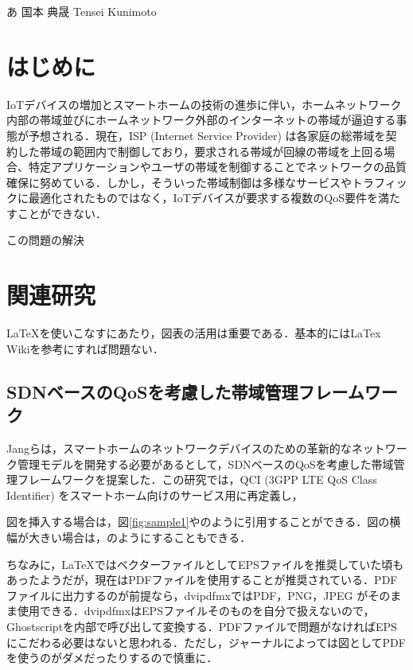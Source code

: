 \documentclass[a4paper,10pt,twocolumn,uplatex]{jsarticle}
\date{13}
\begin{document}
{あ}
{国本 典晟}
{Tensei Kunimoto}

\section{はじめに}
IoTデバイスの増加とスマートホームの技術の進歩に伴い，ホームネットワーク内部の帯域並びにホームネットワーク外部のインターネットの帯域が逼迫する事態が予想される．現在，ISP (Internet Service Provider) は各家庭の総帯域を契約した帯域の範囲内で制御しており，要求される帯域が回線の帯域を上回る場合、特定アプリケーションやユーザの帯域を制御することでネットワークの品質確保に努めている\cite{guideline}．しかし，そういった帯域制御は多様なサービスやトラフィックに最適化されたものではなく，IoTデバイスが要求する複数のQoS要件を満たすことができない．\par
この問題の解決

\section{関連研究}
\LaTeX{}を使いこなすにあたり，図表の活用は重要である．基本的にはLaTex Wiki\cite{latex_wiki}を参考にすれば問題ない．\par

\subsection{SDNベースのQoSを考慮した帯域管理フレームワーク}
Jangらは，スマートホームのネットワークデバイスのための革新的なネットワーク管理モデルを開発する必要があるとして，SDNベースのQoSを考慮した帯域管理フレームワークを提案した\cite{framework}．この研究では，QCI (3GPP LTE QoS Class Identifier) をスマートホーム向けのサービス用に再定義し，\par
図を挿入する場合は，図\ref{fig:sample1}やのように引用することができる．図の横幅が大きい場合は，のようにすることもできる．\par
ちなみに，\LaTeX{}ではベクターファイルとしてEPSファイルを推奨していた頃もあったようだが，現在はPDFファイルを使用することが推奨されている．PDFファイルに出力するのが前提なら，dvipdfmxではPDF，PNG，JPEG がそのまま使用できる．dvipdfmxはEPSファイルそのものを自分で扱えないので，Ghostscriptを内部で呼び出して変換する．PDFファイルで問題がなければEPSにこだわる必要はないと思われる．ただし，ジャーナルによっては図としてPDFを使うのがダメだったりするので慎重に．
\end{document}
